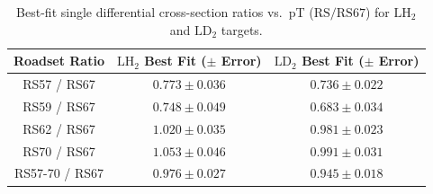 \begin{table}[htbp]
\centering
\caption{Best-fit single differential cross-section ratios vs.\ pT ($\text{RS} / \text{RS67}$) for $\text{LH}_2$ and $\text{LD}_2$ targets.}
\label{tab:xsec_ratios_pt_vs_rs67}
\begin{tabular}{|c|c|c|}
\hline
\textbf{Roadset Ratio} & \textbf{$\text{LH}_2$ Best Fit ($\pm$ Error)} & \textbf{$\text{LD}_2$ Best Fit ($\pm$ Error)} \\
\hline
RS57 / RS67 & $0.773 \pm 0.036$ & $0.736 \pm 0.022$ \\
\hline
RS59 / RS67 & $0.748 \pm 0.049$ & $0.683 \pm 0.034$ \\
\hline
RS62 / RS67 & $1.020 \pm 0.035$ & $0.981 \pm 0.023$ \\
\hline
RS70 / RS67 & $1.053 \pm 0.046$ & $0.991 \pm 0.031$ \\
\hline
RS57-70 / RS67 & $0.976 \pm 0.027$ & $0.945 \pm 0.018$ \\
\hline
\end{tabular}
\end{table}
